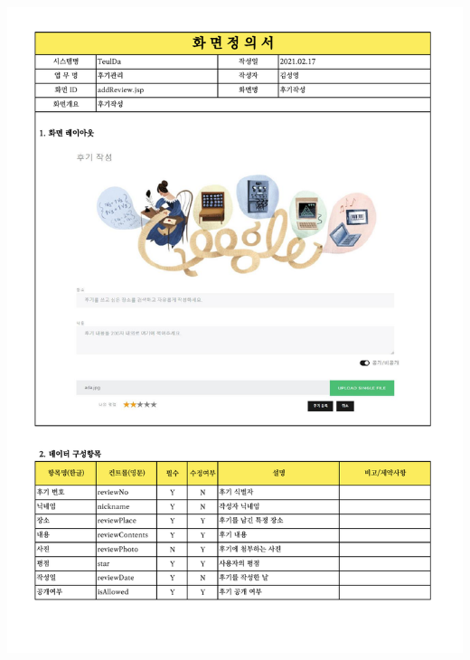 {{{{{{{{{{{{{{{{{{{{{{{{{{{{{{{{{{{{{{{{{{{{{{{{{{{{{{{{{{{{{{{{{{{{{{\includegraphics[width=20cm]{./Figure/Design/Display/review/review_01.pdf} \\
}}}}}}}}}}}}}}}}}}}}}}}}}}}}}}}}}}}}}}}}}}}}}}}}}}}}}}}}}}}}}}}}}}}}}}
